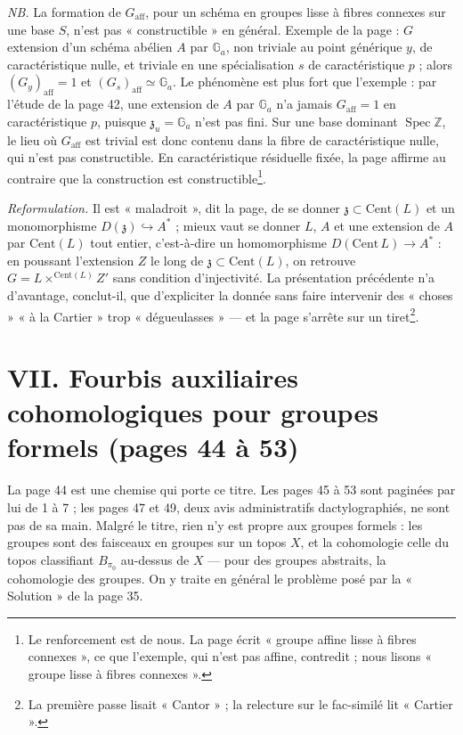 \documentclass[11pt,a4paper]{article}
\begin{document}
\emph{NB.} La formation de $G_{\mathrm{aff}}$, pour un schéma en groupes
lisse à fibres connexes sur une base $S$, n'est pas « constructible » en
général. Exemple de la page : $G$ extension d'un schéma abélien $A$ par
$\mathbb{G}_a$, non triviale au point générique $y$, de caractéristique
nulle, et triviale en une spécialisation $s$ de caractéristique $p$ ; alors
$(G_y)_{\mathrm{aff}} = 1$ et $(G_s)_{\mathrm{aff}} \simeq \mathbb{G}_a$. Le
phénomène est plus fort que l'exemple : par l'étude de la page 42, une
extension de $A$ par $\mathbb{G}_a$ n'a jamais $G_{\mathrm{aff}} = 1$ en
caractéristique $p$, puisque $\mathfrak{z}_u = \mathbb{G}_a$ n'est pas fini.
Sur une base dominant $\operatorname{Spec}\mathbb{Z}$, le lieu où
$G_{\mathrm{aff}}$ est trivial est donc contenu dans la fibre de
caractéristique nulle, qui n'est pas constructible. En caractéristique
résiduelle fixée, la page affirme au contraire que la construction est
constructible\footnote{Le renforcement est de nous. La page écrit « groupe
affine lisse à fibres connexes », ce que l'exemple, qui n'est pas affine,
contredit ; nous lisons « groupe lisse à fibres connexes ».}.

\emph{Reformulation.} Il est « maladroit », dit la page, de se donner
$\mathfrak{z} \subset \mathrm{Cent}(L)$ et un monomorphisme
$D(\mathfrak{z}) \hookrightarrow A^{*}$ ; mieux vaut se donner $L$, $A$ et une
extension de $A$ par $\mathrm{Cent}(L)$ tout entier, c'est-à-dire un
homomorphisme $D(\mathrm{Cent}\,L) \to A^{*}$ : en poussant l'extension $Z$
le long de $\mathfrak{z} \subset \mathrm{Cent}(L)$, on retrouve
$G = L \times^{\mathrm{Cent}(L)} Z'$ sans condition d'injectivité. La
présentation précédente n'a d'avantage, conclut-il, que d'expliciter la
donnée sans faire intervenir des « choses » « à la Cartier » trop « dégueulasses » — et la page s'arrête sur un tiret\footnote{La première passe lisait « Cantor » ; la relecture sur le fac-similé lit « Cartier ».}.

\section*{VII. Fourbis auxiliaires cohomologiques pour groupes formels (pages 44 à 53)}

La page 44 est une chemise qui porte ce titre. Les pages 45 à 53 sont
paginées par lui de 1 à 7 ; les pages 47 et 49, deux avis administratifs
dactylographiés, ne sont pas de sa main. Malgré le titre, rien n'y est propre aux groupes formels :
les groupes sont des faisceaux en groupes sur un topos $X$, et la
cohomologie celle du topos classifiant $B_{\pi_0}$ au-dessus de $X$ — pour
des groupes abstraits, la cohomologie des groupes. On y traite en général le
problème posé par la « Solution » de la page 35.
\end{document}
